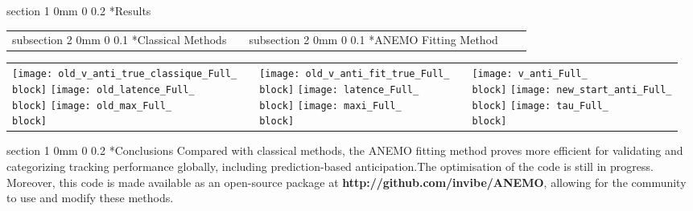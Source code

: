 \documentclass[profile,final,english, draft]{sciposter}%
\makeatletter
\renewcommand{\section}{\@startsection
        {section}%
        {1}%
        {0mm}%
        {0\baselineskip}%
        {0.2\baselineskip}%
        {\LARGE\color{red}\bfseries}}%
\renewcommand{\subsection}{\@startsection
        {subsection}%
        {2}%
        {0mm}%
        {0\baselineskip}%
        {0.1\baselineskip}%
        {\Large\color[rgb]{0.4,0,0}\bfseries}}%
\newcommand{\block}{1}
\makeatother
\begin{document}
\vspace{.5\baselineskip}

\section*{Results}
\vspace{-.7\baselineskip}

\begin{tabular}{p{}m{}p{}m{}p{}}
\subsection*{Classical Methods}
&&
\subsection*{ANEMO Fitting Method}
&&
\end{tabular}

\vspace{-2\baselineskip}
\begin{tabular}{m{}m{}m{}m{}m{}}
\texttt{[image: old\_v\_anti\_true\_classique\_Full\_\\block]}
\texttt{[image: old\_latence\_Full\_\\block]}
\texttt{[image: old\_max\_Full\_\\block]}
& &
\texttt{[image: old\_v\_anti\_fit\_true\_Full\_\\block]}
\texttt{[image: latence\_Full\_\\block]}
\texttt{[image: maxi\_Full\_\\block]}
& &
\texttt{[image: v\_anti\_Full\_\\block]}
\texttt{[image: new\_start\_anti\_Full\_\\block]}
\texttt{[image: tau\_Full\_\\block]}
\end{tabular}


\vspace{.5\baselineskip}

\section*{Conclusions}
\vspace{-.7\baselineskip}
Compared with classical methods, the ANEMO fitting method proves more efficient for validating and categorizing tracking performance globally, including prediction-based anticipation.The optimisation of the code is still in progress. Moreover, this code is made available as an open-source package at \textbf{http://github.com/invibe/ANEMO}, allowing for the community to use and modify these methods.
{\tiny
\printbibliography
}


\end{document}
